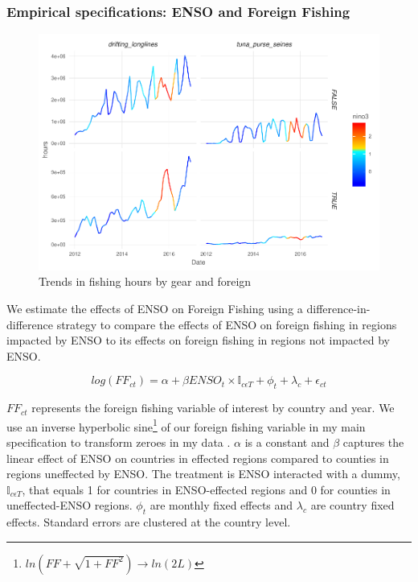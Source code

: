 \documentclass[11pt]{article}
\begin{document}
\subsubsection{Empirical specifications: ENSO and Foreign Fishing}
\label{ENSO_FF}

\begin{figure}
\centering
\includegraphics{img/unnamed-chunk-7-1.pdf}
\caption{Trends in fishing hours by gear and foreign}
\end{figure}

We estimate the effects of ENSO on Foreign Fishing using a difference-in-difference strategy to compare the effects of ENSO on foreign fishing in regions impacted by ENSO to its effects on foreign fishing in regions not impacted by ENSO. 

\begin{equation}
\label{eq_FF}
log(FF_{ct}) = \alpha + \beta ENSO_{t} \times \mathbb{I}_{c \epsilon T} + \phi_{t} + \lambda_{c} + \epsilon_{ct}
\end{equation}


\noindent $FF_{ct}$ represents the foreign fishing variable of interest by country and year. We use an inverse hyperbolic sine\footnote{$ln(FF+\sqrt{1+FF^2}) \xrightarrow{} ln(2L)$} of our foreign fishing variable in my main specification to transform zeroes in my data \cite{Burbidge:1988, Card:2017}. $\alpha$ is a constant and $\beta$ captures the linear effect of ENSO on countries in effected regions compared to counties in regions uneffected by ENSO. The treatment is ENSO interacted with a dummy, $\mathbb{I}_{c \epsilon T}$, that equals 1 for countries in ENSO-effected regions and 0 for counties in uneffected-ENSO regions. $\phi_{t}$ are monthly fixed effects and $\lambda_{c}$ are country fixed effects. Standard errors are clustered at the country level.
\end{document}
